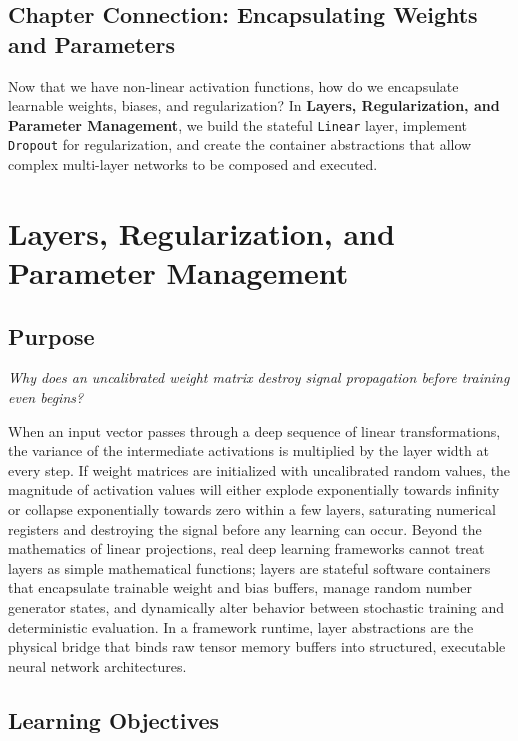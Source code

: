 \documentclass[
  letterpaper,
]{scrbook}
\begin{document}
\section{Chapter Connection: Encapsulating Weights and
Parameters}\label{chapter-connection-encapsulating-weights-and-parameters}

Now that we have non-linear activation functions, how do we encapsulate
learnable weights, biases, and regularization? In \textbf{Layers,
Regularization, and Parameter Management}, we build the stateful
\texttt{Linear} layer, implement \texttt{Dropout} for regularization,
and create the container abstractions that allow complex multi-layer
networks to be composed and executed.

\chapter{Layers, Regularization, and Parameter
Management}\label{layers-regularization-and-parameter-management}

\section*{Purpose}\label{purpose-3}


\emph{Why does an uncalibrated weight matrix destroy signal propagation
before training even begins?}

When an input vector passes through a deep sequence of linear
transformations, the variance of the intermediate activations is
multiplied by the layer width at every step. If weight matrices are
initialized with uncalibrated random values, the magnitude of activation
values will either explode exponentially towards infinity or collapse
exponentially towards zero within a few layers, saturating numerical
registers and destroying the signal before any learning can occur.
Beyond the mathematics of linear projections, real deep learning
frameworks cannot treat layers as simple mathematical functions; layers
are stateful software containers that encapsulate trainable weight and
bias buffers, manage random number generator states, and dynamically
alter behavior between stochastic training and deterministic evaluation.
In a framework runtime, layer abstractions are the physical bridge that
binds raw tensor memory buffers into structured, executable neural
network architectures.

\section{Learning Objectives}\label{learning-objectives-3}
\end{document}
